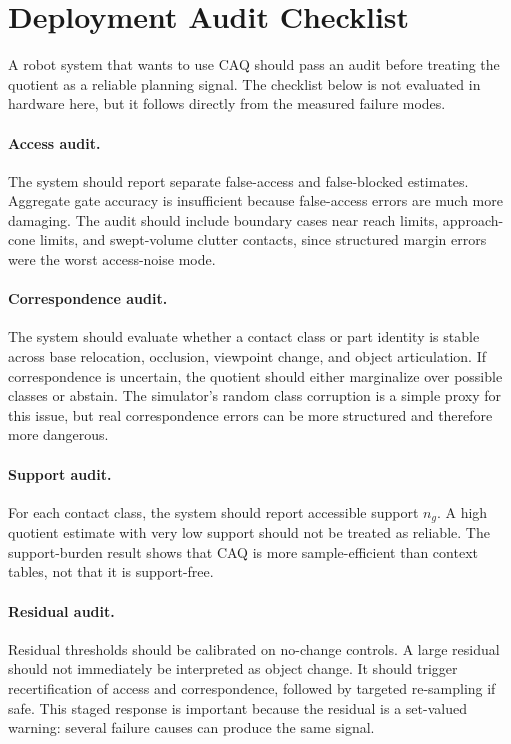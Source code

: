 \documentclass{article}
\begin{document}
\section{Deployment Audit Checklist}

A robot system that wants to use CAQ should pass an audit before treating the quotient as a reliable planning signal. The checklist below is not evaluated in hardware here, but it follows directly from the measured failure modes.

\paragraph{Access audit.}
The system should report separate false-access and false-blocked estimates. Aggregate gate accuracy is insufficient because false-access errors are much more damaging. The audit should include boundary cases near reach limits, approach-cone limits, and swept-volume clutter contacts, since structured margin errors were the worst access-noise mode.

\paragraph{Correspondence audit.}
The system should evaluate whether a contact class or part identity is stable across base relocation, occlusion, viewpoint change, and object articulation. If correspondence is uncertain, the quotient should either marginalize over possible classes or abstain. The simulator's random class corruption is a simple proxy for this issue, but real correspondence errors can be more structured and therefore more dangerous.

\paragraph{Support audit.}
For each contact class, the system should report accessible support $n_g$. A high quotient estimate with very low support should not be treated as reliable. The support-burden result shows that CAQ is more sample-efficient than context tables, not that it is support-free.

\paragraph{Residual audit.}
Residual thresholds should be calibrated on no-change controls. A large residual should not immediately be interpreted as object change. It should trigger recertification of access and correspondence, followed by targeted re-sampling if safe. This staged response is important because the residual is a set-valued warning: several failure causes can produce the same signal.
\end{document}
